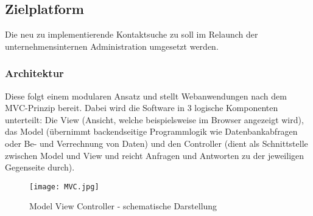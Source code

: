 \subsection{Zielplatform}
    Die neu zu implementierende Kontaktsuche zu soll im Relaunch der unternehmensinternen Administration umgesetzt werden.

    \subsubsection{Architektur}
        Diese folgt einem modularen Ansatz und stellt Webanwendungen nach dem MVC-Prinzip bereit. Dabei wird die Software in 3 logische Komponenten unterteilt: Die View (Ansicht, welche beispielsweise im Browser angezeigt wird), das Model (übernimmt backendseitige Programmlogik wie Datenbankabfragen oder Be- und Verrechnung von Daten) und den Controller (dient als Schnittstelle zwischen Model und View und reicht Anfragen und Antworten zu der jeweiligen Gegenseite durch).

        \vspace{0.5cm}
        \begin{figure}[h]
            \centering
            \texttt{[image: MVC.jpg]}
            \caption{Model View Controller - schematische Darstellung}
        \end{figure}

